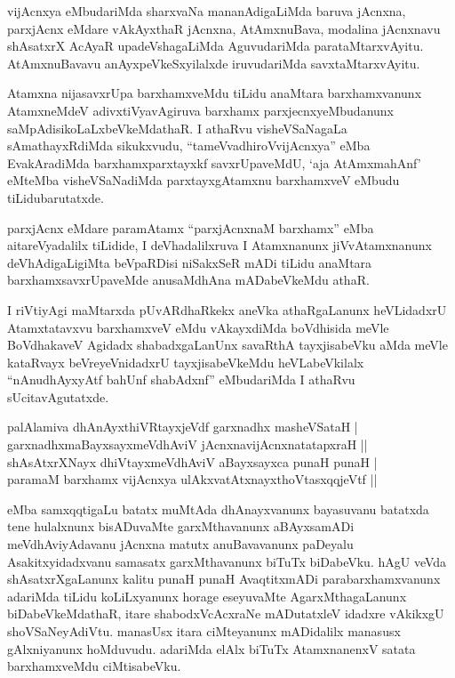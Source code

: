 \begin{artha}
vijAcnxya eMbudariMda sharxvaNa mananAdigaLiMda baruva jAcnxna, parxjAcnx eMdare vAkAyxthaR jAcnxna, AtAmxnuBava, modalina jAcnxnavu shAsatxrX AcAyaR upadeVshagaLiMda AguvudariMda parataMtarxvAyitu. AtAmxnuBavavu anAyxpeVkeSxyilalxde iruvudariMda savxtaMtarxvAyitu.
\end{artha}


\begin{artha}
Atamxna nijasavxrUpa barxhamxveMdu tiLidu anaMtara barxhamxvanunx AtamxneMdeV adivxtiVyavAgiruva barxhamx parxjecnxyeMbudanunx saMpAdisikoLaLxbeVkeMdathaR. I athaRvu visheVSaNagaLa sAmathayxRdiMda sikukxvudu, ``tameVvadhiroVvijAcnxya'' eMba EvakAradiMda barxhamxparxtayxkf savxrUpaveMdU, `aja AtAmxmahAnf' eMteMba visheVSaNadiMda parxtayxgAtamxnu barxhamxveV eMbudu tiLidubarutatxde. 
\end{artha}


\begin{artha}
parxjAcnx eMdare paramAtamx ``parxjAcnxnaM barxhamx'' eMba aitareVyadalilx tiLidide, I deVhadalilxruva I Atamxnanunx jiVvAtamxnanunx deVhAdigaLigiMta beVpaRDisi niSakxSeR mADi tiLidu anaMtara barxhamxsavxrUpaveMde anusaMdhAna mADabeVkeMdu athaR.

I riVtiyAgi maMtarxda pUvARdhaRkekx aneVka athaRgaLanunx heVLidadxrU Atamxtatavxvu barxhamxveV eMdu vAkayxdiMda boVdhisida meVle BoVdhakaveV Agidadx shabadxgaLanUnx savaRthA tayxjisabeVku aMda meVle kataRvayx beVreyeVnidadxrU tayxjisabeVkeMdu heVLabeVkilalx ``nAnudhAyxyAtf bahUnf shabAdxnf'' eMbudariMda I athaRvu sUcitavAgutatxde.
\end{artha}

\begin{shl}
palAlamiva dhAnAyxthiVRtayxjeVdf garxnadhx masheVSataH |\\
garxnadhxmaBayxsayxmeVdhAviV jAcnxnavijAcnxnatatapxraH ||\\
shAsAtxrXNayx dhiVtayxmeVdhAviV aBayxsayxca punaH punaH |\\
paramaM barxhamx vijAcnxya ulAkxvatAtxnayxthoVtasxqqjeVtf ||
\end{shl}

\begin{artha}
eMba samxqqtigaLu batatx muMtAda dhAnayxvanunx bayasuvanu batatxda tene hulalxnunx bisADuvaMte garxMthavanunx aBAyxsamADi meVdhAviyAdavanu jAcnxna matutx anuBavavanunx paDeyalu Asakitxyidadxvanu samasatx garxMthavanunx biTuTx biDabeVku. hAgU veVda shAsatxrXgaLanunx kalitu punaH punaH AvaqtitxmADi parabarxhamxvanunx adariMda tiLidu koLiLxyanunx horage eseyuvaMte AgarxMthagaLanunx biDabeVkeMdathaR, itare shabodxVcAcxraNe mADutatxleV idadxre vAkikxgU shoVSaNeyAdiVtu. manasUsx itara ciMteyanunx mADidalilx manasusx gAlxniyanunx hoMduvudu. adariMda elAlx biTuTx AtamxnanenxV satata barxhamxveMdu ciMtisabeVku.
\end{artha}

